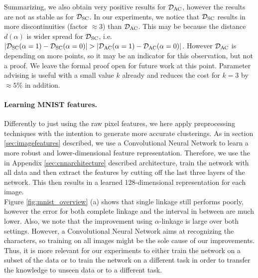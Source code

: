 Summarizing, we also obtain very positive results for $\mathcal{D}_\text{AC}$, however the results are not as stable as for $\mathcal{D}_\text{SC}$. In our experiments, we notice that $\mathcal{D}_\text{SC}$ results in more discontinuities (factor $\approx 3$) than $\mathcal{D}_\text{AC}$. This may be because the distance $d(\alpha)$ is wider spread for $\mathcal{D}_\text{SC}$, i.e. $|\mathcal{D}_\text{SC}(\alpha = 1) - \mathcal{D}_\text{SC}(\alpha = 0)| > |\mathcal{D}_\text{AC}(\alpha = 1) - \mathcal{D}_\text{AC}(\alpha = 0)|$. However $\mathcal{D}_\text{AC}$ is depending on more points, so it may be an indicator for this observation, but not a proof. We leave the formal proof open for future work at this point. Parameter advising is useful with a small value $k$ already and reduces the cost for $k = 3$ by $\approx 5\%$ in addition.

\paragraph{Learning MNIST features.} Differently to just using the raw pixel features, we here apply preprocessing techniques with the intention to generate more accurate clusterings. As in section \ref{sec:imagefeatures} described, we use a Convolutional Neural Network to learn a more robust and lower-dimensional feature representation. Therefore, we use the in Appendix \ref{sec:cnnarchitecture} described architecture, train the network with all data and then extract the features by cutting off the last three layers of the network. This then results in a learned 128-dimensional representation for each image.\\

Figure \ref{fig:mnist_overview} (a) shows that single linkage still performs poorly, however the error for both complete linkage and the interval in between are much lower. Also, we note that the improvement using $\alpha$-linkage is large over both settings. However, a Convolutional Neural Network aims at recognizing the characters, so training on all images might be the sole cause of our improvements. Thus, it is more relevant for our experiments to either train the network on a subset of the data or to train the network on a different task in order to transfer the knowledge to unseen data or to a different task.

